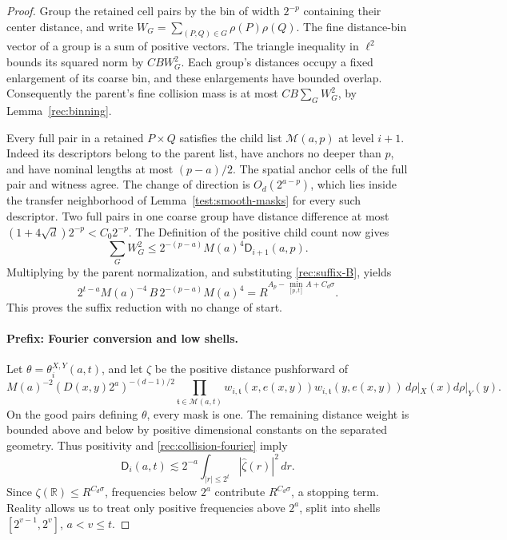 \begin{proof}
Group the retained cell pairs by the bin of width \(2^{-p}\)
containing their center distance, and write
\(W_G=\sum_{(P,Q)\in G}\rho(P)\rho(Q)\).
The fine distance-bin vector of a group is a sum of positive vectors.
The triangle inequality in \(\ell^2\) bounds its squared norm by
\(CBW_G^2\).  Each group's distances occupy a fixed enlargement of
its coarse bin, and these enlargements have bounded overlap.
Consequently the parent's fine collision mass is at most
\(CB\sum_GW_G^2\), by Lemma~\ref{rec:binning}.

Every full pair in a retained \(P\times Q\) satisfies the child list
\(\mathcal M(a,p)\) at level \(i+1\).  Indeed its descriptors belong
to the parent list, have anchors no deeper than \(p\), and have
nominal lengths at most \((p-a)/2\).  The spatial anchor cells of the
full pair and witness agree.  The change of direction is
\(O_d(2^{a-p})\), which lies inside the transfer neighborhood of
Lemma~\ref{test:smooth-masks} for every such descriptor.  Two full
pairs in one coarse group have distance difference at most
\((1+4\sqrt d)2^{-p}<C_0 2^{-p}\).  The Definition of the positive
child count now gives
\[
 \sum_GW_G^2
 \le 2^{-(p-a)}M(a)^4\mathsf D_{i+1}(a,p).
\]
Multiplying by the parent normalization, and substituting
\eqref{rec:suffix-B}, yields
\[
 2^{t-a}M(a)^{-4}\,B\,
 2^{-(p-a)}M(a)^4
 =R^{A_p-\min_{[p,t]}A+C_d\sigma}.
\]
This proves the suffix reduction with no change of start.

\paragraph{Prefix: Fourier conversion and low shells.}
Let \(\theta=\theta_i^{X,Y}(a,t)\), and let \(\zeta\) be the positive
distance pushforward of
\[
 M(a)^{-2}(D(x,y)2^a)^{-(d-1)/2}
 \prod_{\mathfrak t\in\mathcal M(a,t)}
 w_{i,\mathfrak t}(x,e(x,y))w_{i,\mathfrak t}(y,e(x,y))
 \,d\rho|_X(x)d\rho|_Y(y).
\]
On the good pairs defining \(\theta\), every mask is one.  The
remaining distance weight is bounded above and below by positive
dimensional constants on the separated geometry.  Thus positivity and
\eqref{rec:collision-fourier} imply
\begin{equation}\label{rec:prefix-lowpass}
 \mathsf D_i(a,t)
 \lesssim 2^{-a}\int_{|r|\le2^t}|\widehat\zeta(r)|^2\,dr.
\end{equation}
Since \(\zeta(\mathbb R)\le R^{C_d\sigma}\), frequencies below
\(2^a\) contribute \(R^{C_d\sigma}\), a stopping term.  Reality
allows us to treat only positive frequencies above \(2^a\), split
into shells \([2^{v-1},2^v]\), \(a<v\le t\).


\end{proof}

